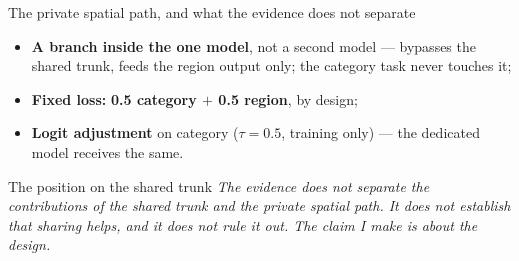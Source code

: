 \documentclass{beamer}
\begin{document}
\begin{frame}{The private spatial path, and what the evidence does not separate}
    \begin{itemize}
        \item \textbf{A branch inside the one model}, not a second model --- bypasses the shared
              trunk, feeds the region output only; \alert{the category task never touches it};
        \item \textbf{Fixed loss:} \textbf{0.5 category $+$ 0.5 region}, by design;
        \item \textbf{Logit adjustment} on category ($\tau = 0.5$, training only) ---
              \alert{the dedicated model receives the same}.
    \end{itemize}

    \bigskip
    \begin{alertblock}{The position on the shared trunk}
        \small
        \emph{The evidence does not separate the contributions of the shared trunk and the private
        spatial path. It does not establish that sharing helps, and it does not rule it out.
        The claim I make is about the design.}
    \end{alertblock}
\end{frame}
\end{document}
